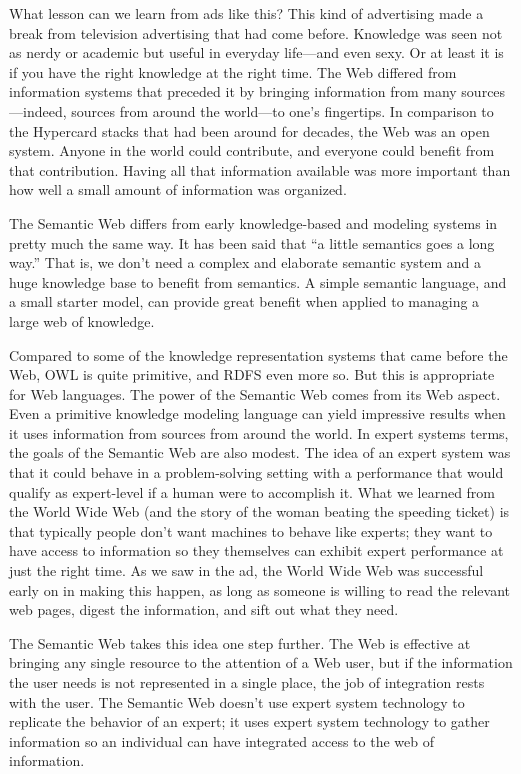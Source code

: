 What lesson can we learn from ads like this? This kind of advertising
made a break from television advertising that had come before. Knowledge
was seen not as nerdy or academic but useful in everyday life---and even
sexy. Or at least it is if you have the right knowledge at the right
time. The Web differed from information systems that preceded it by
bringing information from many sources---indeed, sources from around the
world---to one's fingertips. In comparison to the Hypercard stacks that had
been around for decades, the Web was an open system. Anyone in the world
could contribute, and everyone could benefit from that contribution.
Having all that information available was more important than how well a
small amount of information was organized.

The Semantic Web differs from early knowledge-based and modeling systems in pretty much the same
way. It has been said that ``a little semantics goes a long way.'' \cite{littlesem}   That is, we don't need
a complex and elaborate semantic system and a huge knowledge base to benefit from semantics.  A 
simple semantic language, and  a small starter model, can provide great benefit when applied to managing
a large web of knowledge. 

Compared to some of the knowledge 
representation systems that came before the Web, OWL is quite
primitive, and RDFS even more so. But this is appropriate for  Web languages. The power of the
Semantic Web comes from its  Web aspect. Even a primitive knowledge
modeling language can yield impressive results when it uses information
from sources from around the world. In expert systems terms, the goals
of the Semantic Web are also modest. The idea of an expert system was
that it could behave in a problem-solving setting with a performance
that would qualify as expert-level if a human were to accomplish it.
What we learned from the World Wide Web (and the story of the woman
beating the speeding ticket) is that typically people don't want
machines to behave like experts; they want to have access to information
so they themselves can exhibit expert performance at just the right time. As we saw
in the ad, the World Wide Web was successful early on in making this
happen, as long as someone is willing to read the relevant web pages,
digest the information, and sift out what they need. 

The Semantic Web takes this idea one step further. The Web is effective
at bringing any single resource to the attention of a Web user, but if
the information the user needs is not represented in a single place, the
job of integration rests with the user. The Semantic Web doesn't use
expert system technology to replicate the behavior of an expert; it uses
expert system technology to gather information so an individual can have
integrated access to the web of information.

